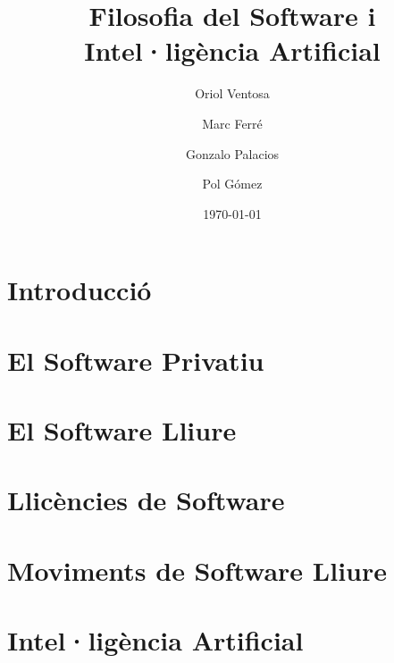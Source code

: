 \documentclass[a4paper,12pt]{report}
\begin{document}
\title{
	{\bf Filosofia del Software i Intel·ligència Artificial}
}
\author{
	Oriol Ventosa \and
	Marc Ferré \and
	Gonzalo Palacios \and
	Pol Gómez
}
\date{\today}
\maketitle

\tableofcontents

\chapter{Introducció}


\chapter{El Software Privatiu}


\chapter{El Software Lliure}


\chapter{Llicències de Software}


\chapter{Moviments de Software Lliure}


\chapter{Intel·ligència Artificial}





\end{document}

